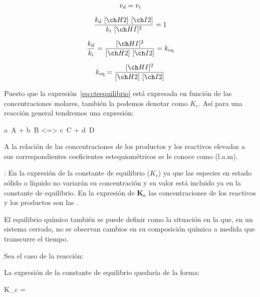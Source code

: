 \begin{gather}
    v_d = v_i \notag \separ
    \dfrac{k_d\ \conc{H2}\ \conc{I2}}{k_i\ \conc{HI}^2} = 1 \notag \separ
    \dfrac{k_d}{k_i} = \dfrac{\conc{HI}^2}{\conc{H2}\ \conc{I2}} = k_{\text{eq}} \notag  \separ
    k_{\text{eq}} = \dfrac{\conc{HI}^2}{\conc{H2}\ \conc{I2}} \label{eq:cteequilibrio}
\end{gather}

Puesto que la expresión~\eqref{eq:cteequilibrio} está expresada en función de las concentraciones molares, también la podemos denotar como $K_c$.
Así para una reacción general tendremos una expresión:
\begin{reaction}
    a\ A\gas{} + b\ B \gas{} <=> c\ C \gas{} + d\ D\gas{} \label{rxn:reacciongeneral}
\end{reaction}

\begin{centeredequation}
\end{centeredequation}

A la relación de las concentraciones de los productos y los reactivos elevadas a sus correspondientes coeficientes estequiométricos se le conoce como  (l.a.m).

: En la expresión de la constante de equilibrio (\( K_c \))  ya que las especies en estado sólido o líquido no variarán su concentración y su valor está incluido ya en la constante de equilibrio.
En la expresión de $\bm{K_c}$ las concentraciones de los reactivos y los productos son las .

El equilibrio químico también se puede definir como la situación en la que, en un sistema cerrado, no se observan cambios en su composición química a medida que transcurre el tiempo.

\begin{example}
    Sea el caso de la reacción:

    \begin{centeredequation}
    \end{centeredequation}
    La expresión de la constante de equilibrio quedaría de la forma:
    \begin{centeredequation}
        K_c = 
    \end{centeredequation}
\end{example}

